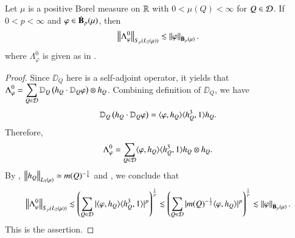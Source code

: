 \documentclass[leqno]{amsart}
\begin{document}
\begin{corollary}\label{L0 Sp}
Let $\mu$ is a positive Borel measure on ${\mathbb R}$ with $0<\mu(Q)<\infty$ for $Q\in{\mathcal D}$. If $0<p<\infty$ and $\varphi\in\dot{\mathbf B}_{p}(\mu)$, then 
$$\left\| \Lambda^{0}_{\varphi} \right\|_{S_{p}(L_{2}(\mu))}
\lesssim\left\| \varphi \right\|_{\dot{\mathbf B}_{p}(\mu)}.$$
where $\Lambda^{0}_{\varphi}$ is given as in .
\end{corollary}
\begin{proof}
Since $\DD_{Q}$ here is a self-adjoint operator, it yields that
$\displaystyle\Lambda^{0}_{\varphi}=\sum_{Q\in{\mathcal D}}\mathbb{D}_{Q}\left(h_{Q}\cdot\mathbb{D}_{Q}\varphi\right)\otimes h_{Q}$.
Combining definition of $\DD_{Q}$, we have
$$\mathbb{D}_{Q}\left(h_{Q}\cdot\mathbb{D}_{Q}\varphi\right)=\langle \varphi,h_{Q} \rangle\langle h_{Q}^{3},1 \rangle h_{Q}.$$
Therefore,
\begin{align*}
\Lambda^{0}_{\varphi}=
\sum_{Q\in{\mathcal D}}\langle \varphi,h_{Q} \rangle\langle h_{Q}^{3},1 \rangle h_{Q}\otimes h_{Q}.
\end{align*}
By , $\left\| h_{Q} \right\|_{L_{3}(\mu)}\simeq m(Q)^{-\frac{1}{6}}$ and , we conclude that
\begin{align*}
\left\| \Lambda^{0}_{\varphi} \right\|_{S_{p}(L_{2}(\mu))}
\lesssim\left(\sum_{Q\in{\mathcal D}}|\langle \varphi,h_{Q} \rangle\langle h_{Q}^{3},1 \rangle|^{p}\right)^{\frac{1}{p}}
\lesssim\left(\sum_{Q\in{\mathcal D}}|m(Q)^{-\frac{1}{2}}\langle \varphi,h_{Q} \rangle|^{p}\right)^{\frac{1}{p}}
\lesssim\left\| \varphi \right\|_{\dot{\mathbf B}_{p}(\mu)}.
\end{align*}
This is the assertion.


\end{proof}
\end{document}
